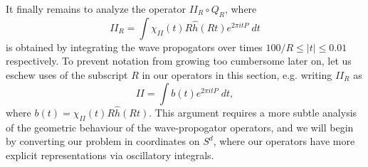 It finally remains to analyze the operator $II_R \circ Q_R$, where
%
\[ II_R = \int \chi_{II}(t) R \widehat{h}(Rt) e^{2 \pi i t P}\; dt \] %
%
is obtained by integrating the wave propogators over times $100/R \leq |t| \leq 0.01$ respectively. To prevent notation from growing too cumbersome later on, let us eschew uses of the subscript $R$ in our operators in this section, e.g. writing $II_R$ as
%
\[ II = \int b(t) e^{2 \pi i t P}\; dt, \]
%
where $b(t) = \chi_{II}(t) R \widehat{h}(Rt)$. This argument requires a more subtle analysis of the geometric behaviour of the wave-propogator operators, and we will begin by converting our problem in coordinates on $S^d$, where our operators have more explicit representations via oscillatory integrals.
\begin{comment}

To prevent notation from growing too cumbersome later on, let us eschew uses of the subscript $R$ in our operators for now, e.g. writing the operator $II_R$ as
%
\[ II = \int b(t) e^{2 \pi i (t/R) P}\; dt. \]


It will be more natural to rescale this operator, writing
%
\[ II_R = \int b_R(t) e^{2 \pi i (t/R) P}\; dt \]
%
with
%
\[ b_R(t) = \chi_{II}(t / R) \widehat{h}(t) \]
%
supported on $|t| \leq R / 100$. Our assumptions on $h$ give that
%
%
%
%
To prevent notation from growing too cumbersome later on, let us eschew uses of the subscript $R$ in our operators for now, e.g. writing the operator $II_R$ as
%
\[ II = \int b(t) e^{2 \pi i (t/R) P}\; dt. \]
%
Essentially, we know the following facts about the function $b$:
%
\begin{itemize}
    \item We have $\| t^{s_p} b_R \|_{L^p(\RR)} \leq C_p(h)$.


\end{comment}
